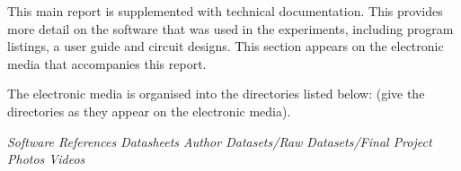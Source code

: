 
\vspace*{0.5cm}

This main report is supplemented with technical documentation. This
provides more detail on the software that was used in the experiments,
including program listings, a user guide and circuit designs. This
section appears on the electronic media that accompanies this report.

The electronic media is organised into the directories listed below:
(give the directories as they appear on the electronic media).

{\itshape
Software \newline
References \newline
Datasheets \newline
Author \newline
Datasets/Raw \newline
Datasets/Final \newline
Project Photos \newline
Videos
}



